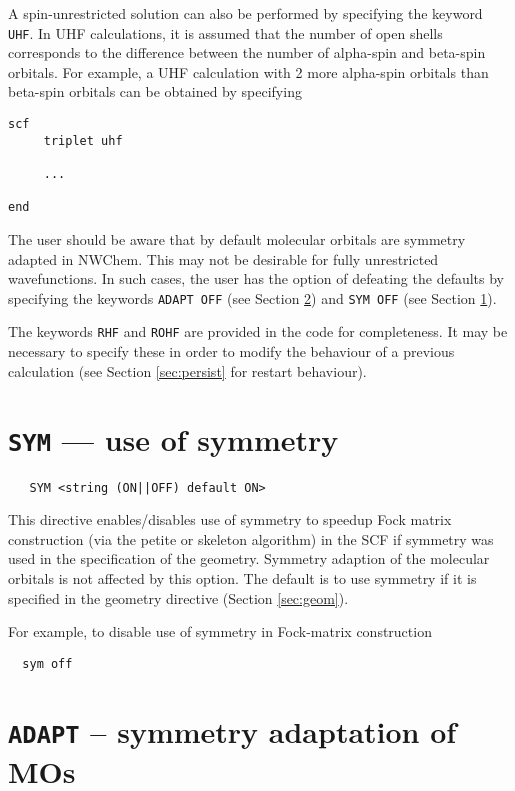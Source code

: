 A spin-unrestricted solution can also be performed by specifying the
keyword \verb+UHF+.  In UHF calculations, it is assumed that the
number of open shells corresponds to the difference between the number
of alpha-spin and beta-spin orbitals.  For example, a UHF calculation
with 2 more alpha-spin orbitals than beta-spin orbitals can be
obtained by specifying

\begin{verbatim}
scf
     triplet uhf

     ...

end
\end{verbatim}

The user should be aware that by default molecular orbitals are
symmetry adapted in NWChem.  This may not be desirable for fully
unrestricted wavefunctions.  In such cases, the user has the option of
defeating the defaults by specifying the keywords \verb+ADAPT OFF+
(see Section \ref{sec:adapt}) and \verb+SYM OFF+ (see Section
\ref{sec:sym}).

The keywords \verb+RHF+ and \verb+ROHF+ are provided in the code for
completeness. It may be necessary to specify these in order to modify
the behaviour of a previous calculation (see Section \ref{sec:persist}
  for restart behaviour).

\section{{\tt SYM} --- use of symmetry}
\label{sec:sym}

 \begin{verbatim}
   SYM <string (ON||OFF) default ON>
 \end{verbatim}

This directive enables/disables use of symmetry to speedup Fock matrix
construction (via the petite or skeleton algorithm) in the SCF if
symmetry was used in the specification of the geometry.  Symmetry
adaption of the molecular orbitals is not affected by this option.
The default is to use symmetry if it is specified in the geometry
directive (Section \ref{sec:geom}). 

For example, to disable use of symmetry in Fock-matrix construction
\begin{verbatim}
  sym off
\end{verbatim}

\section{{\tt ADAPT} -- symmetry adaptation of MOs}
\label{sec:adapt}


